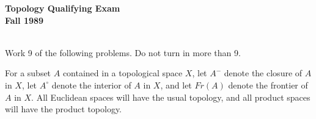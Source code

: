 \documentclass{article}
\begin{document}






\begin{center}\begin{LARGE}
{\bf Topology Qualifying Exam}\\ 
{\bf Fall 1989}\\ \end{LARGE}
\end{center}
\vspace{0.1in}
\noindent\hrulefill\\

Work 9 of the following problems. Do not turn in more than 9.

For a subset $A$ contained in a topological space $X$, let $A^-$ denote
the closure of $A$ in $X$, let $A^\circ$ denote the interior of $A$ in $X$,
and let $Fr(A)$ denote the frontier of $A$ in $X$. All Euclidean spaces will
have the usual topology, and all product spaces will have the product
topology.
\end{document}

